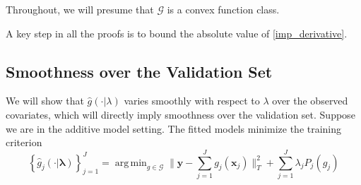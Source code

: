 \documentclass[12pt]{article}
\DeclareMathOperator*{\argmin}{arg\,min}
\begin{document}
Throughout, we will presume that $\mathcal{G}$ is a convex function class.
%
%
%
%

A key step in all the proofs is to bound the absolute value of \eqref{imp_derivative}.

\subsection{Smoothness over the Validation Set}
\label{sec:smoothness_validation}
We will show that $\hat{g}(\cdot | \lambda)$ varies smoothly with respect to $\lambda$ over the observed covariates, which will directly imply smoothness over the validation set. Suppose we are in the additive model setting. The fitted models minimize the training criterion
\begin{equation}
\label{orig_train_criterion}
\left\{ \hat{g}_j(\cdot | \boldsymbol \lambda) \right \}_{j=1}^J = \argmin_{g\in \mathcal{G}} \| \boldsymbol y -  \sum_{j=1}^J g_j(\boldsymbol x_j) \|^2_T + \sum_{j=1}^J \lambda_j P_j(g_j)
\end{equation}
\end{document}
